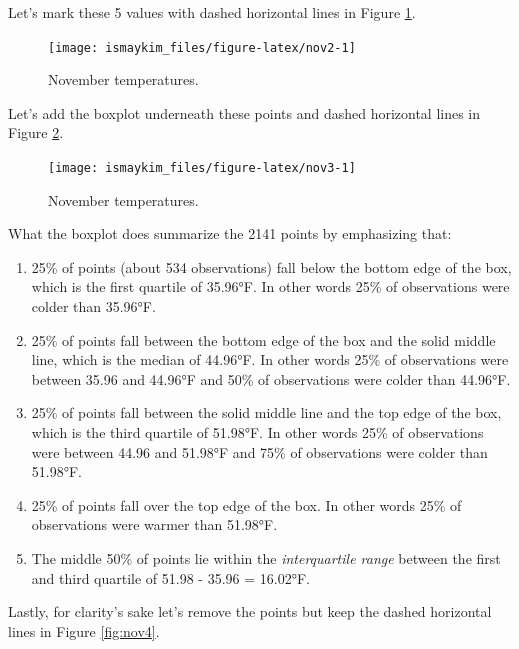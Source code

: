 \documentclass[12pt, krantz2,]{krantz}
\providecommand{\tightlist}{%
  \setlength{\itemsep}{0pt}\setlength{\parskip}{0pt}}
\begin{document}
Let's mark these 5 values with dashed horizontal lines in Figure \ref{fig:nov2}.

\begin{figure}

{\centering \texttt{[image: ismaykim\_files/figure-latex/nov2-1]} 

}

\caption{November temperatures.}\label{fig:nov2}
\end{figure}

Let's add the boxplot underneath these points and dashed horizontal lines in Figure \ref{fig:nov3}.

\begin{figure}

{\centering \texttt{[image: ismaykim\_files/figure-latex/nov3-1]} 

}

\caption{November temperatures.}\label{fig:nov3}
\end{figure}

What the boxplot does summarize the 2141 points by emphasizing that:

\begin{enumerate}
\def\labelenumi{\arabic{enumi}.}
\tightlist
\item
  25\% of points (about 534 observations) fall below the bottom edge of the box, which is the first quartile of 35.96°F. In other words 25\% of observations were colder than 35.96°F.
\item
  25\% of points fall between the bottom edge of the box and the solid middle line, which is the median of 44.96°F. In other words 25\% of observations were between 35.96 and 44.96°F and 50\% of observations were colder than 44.96°F.
\item
  25\% of points fall between the solid middle line and the top edge of the box, which is the third quartile of 51.98°F. In other words 25\% of observations were between 44.96 and 51.98°F and 75\% of observations were colder than 51.98°F.
\item
  25\% of points fall over the top edge of the box. In other words 25\% of observations were warmer than 51.98°F.
\item
  The middle 50\% of points lie within the \emph{interquartile range} between the first and third quartile of 51.98 - 35.96 = 16.02°F.
\end{enumerate}

Lastly, for clarity's sake let's remove the points but keep the dashed horizontal lines in Figure \ref{fig:nov4}.
\end{document}
